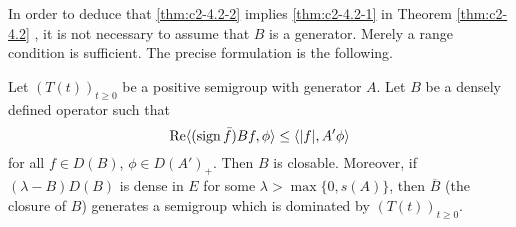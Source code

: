 In order to deduce that \ref{thm:c2-4.2-2}   implies \ref{thm:c2-4.2-1}   in Theorem \ref{thm:c2-4.2}  , it is not
necessary to assume that $B$ is a generator. 
Merely a range condition is sufficient. 
The precise formulation is the following.

\begin{theorem}\label{thm:c2-4.3}
Let $(T(t))_{t \geq 0}$ be a positive semigroup with generator $A$. 
Let $B$ be a densely defined operator such that
\begin{equation}\label{eq:c2-4.4}
\mathop{}\!\mathrm{Re}\langle(\operatorname{sign}  \bar{f})Bf,\phi\rangle \leq \langle|f|,A'\phi\rangle
\end{equation}
for all $f \in D(B)$, $\phi \in D(A')_{+}$.
Then $B$ is closable. 
Moreover, if $(\lambda - B)D(B)$ is dense in $E$ for some $\lambda > \max\{0,s(A)\}$, then $\overline{B}$ (the closure of $B$) generates a
semigroup which is dominated by $(T(t))_{t \geq 0}$.
\end{theorem}
